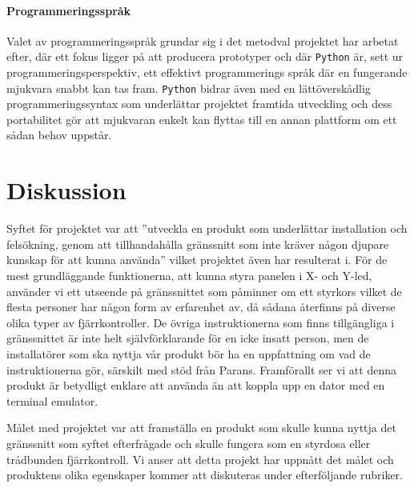 \documentclass{article}
\begin{document}
            \paragraph{\textrm{Programmeringsspråk}} %
            \label{par:programmeringssprak}
               Valet av programmeringsspråk grundar sig i det metodval projektet har arbetat efter, där ett fokus ligger på att producera prototyper och där \texttt{Python} är, sett ur programmeringsperspektiv, ett effektivt programmerings språk där en fungerande mjukvara snabbt kan tas fram. \texttt{Python} bidrar även med en lättöverskådlig prog\-ram\-merings\-syntax som underlättar projektet framtida utveckling och dess portabilitet gör att mjukvaran enkelt kan flyttas till en annan plattform om ett sådan behov uppstår. 
        


    \newpage

    \section{Diskussion} %
    \label{sec:diskussion}

        Syftet för projektet var att ''utveckla en produkt som underlättar installation och felsök\-ning, genom att tillhandahålla gränssnitt som inte kräver någon djupare kunskap för att kunna använda'' vilket projektet även har resulterat i. För de mest grundläggande funktionerna, att kunna styra panelen i X- och Y-led, använder vi ett utseende på gränssnittet som påminner om ett styrkors vilket de flesta personer har någon form av erfarenhet av, då sådana återfinns på diverse olika typer av fjärrkontroller. De övriga instruktionerna som finns tillgängliga i gränssnittet är inte helt självförklarande för en icke insatt person, men de installatörer som ska nyttja vår produkt bör ha en uppfattning om vad de instruktionerna gör, särskilt med stöd från Parans. Framförallt ser vi att denna produkt är betydligt enklare att använda än att koppla upp en dator med en terminal emulator. \bigskip

        \noindent Målet med projektet var att framställa en produkt som skulle kunna nyttja det gränssnitt som syftet efterfrågade och skulle fungera som en styrdosa eller trådbunden fjärrkontroll. Vi anser att detta projekt har uppnått det målet och produktens olika egenskaper kommer att diskuteras under efterföljande rubriker.
\end{document}
